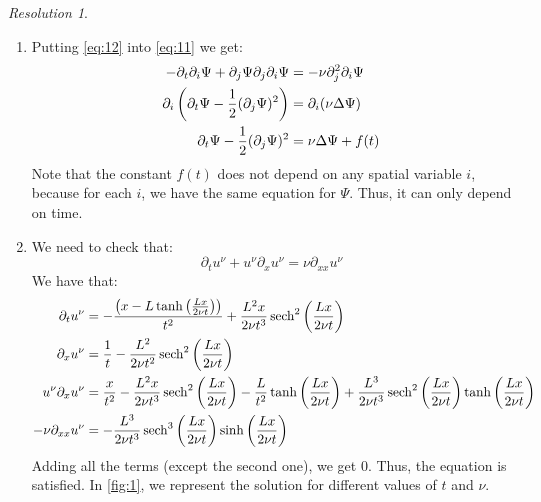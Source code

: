\documentclass[10pt,a4paper]{article}
\theoremstyle{remark}
\newtheorem*{res}{Resolution}
\begin{document}
\begin{res}\hfill
  \begin{enumerate}
    \item Putting \eqref{eq:12} into \eqref{eq:11} we get:
          \begin{align}
            \nonumber-\partial_t \partial_i \Psi + \partial_j \Psi\partial_j \partial_i \Psi  & = -\nu \partial_j^2 \partial_i \Psi \\
            \nonumber\partial_i\left( \partial_t \Psi - \frac{1}{2}(\partial_j \Psi)^2\right) & = \partial_i (\nu \Delta  \Psi) \\
            \label{eq:psi} \partial_t \Psi - \frac{1}{2}(\partial_j \Psi)^2                   & = \nu \Delta  \Psi + f(t)
          \end{align}
          Note that the constant $f(t)$ does not depend on any spatial variable $i$, because for each $i$, we have the same equation for $\Psi$. Thus, it can only depend on time.
    \item We need to check that:
          \begin{equation*}
            \partial_t u^\nu + u^\nu \partial_x u^\nu = \nu \partial_{xx} u^\nu
          \end{equation*}
          We have that:
          \begin{align*}
            \partial_t u^\nu        & =- \frac{ \left(x-L\tanh\left(\frac{Lx}{2\nu t}\right)\right)}{t^2} + \frac{L^2x}{2\nu t^3} \sech^2\left(\frac{Lx}{2\nu t}\right)                                                                                                   \\
            \partial_x u^\nu        & = \frac{1}{t} - \frac{L^2}{2\nu t^2} \sech^2\left(\frac{Lx}{2\nu t}\right)                                                                                                                                                          \\
            u^\nu\partial_x u^\nu   & = \frac{x}{t^2} - \frac{L^2x}{2\nu t^3} \sech^2\left(\frac{Lx}{2\nu t}\right)   - \frac{L}{t^2} \tanh\left(\frac{Lx}{2\nu t}\right) + \frac{L^3}{2\nu t^3} \sech^2\left(\frac{Lx}{2\nu t}\right)\tanh\left(\frac{Lx}{2\nu t}\right) \\
            -\nu\partial_{xx} u^\nu & = -\frac{L^3}{2\nu t^3} \sech^3\left( \frac{Lx}{2\nu t}\right)\sinh\left(\frac{Lx}{2\nu t}\right)
          \end{align*}
          Adding all the terms (except the second one), we get 0. Thus, the equation is satisfied. In \cref{fig:1}, we represent the solution for different values of $t$ and $\nu$.

\end{enumerate}
\end{res}
\end{document}
